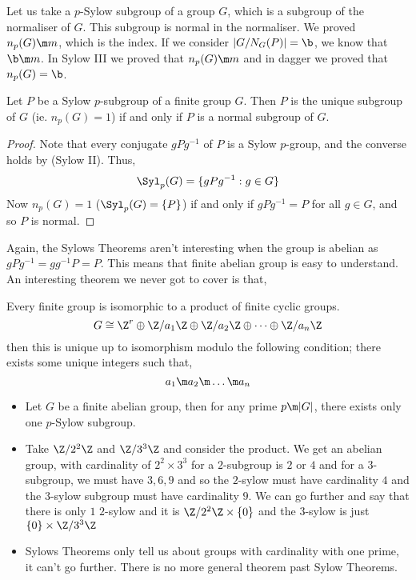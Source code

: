 \noindent
Let us take a $p$-Sylow subgroup of a group $G$, which is a subgroup of the normaliser of $G$. This subgroup is normal in the normaliser. We proved $n_p(G) \m m$, which is the index. If we consider $|G/N_G(P)| = \b$, we know that $\b \m m$. In Sylow III we proved that $n_p(G) \m m$ and in dagger we proved that $n_p(G) = \b$.

\begin{ncor}
  Let $P$ be a Sylow $p$-subgroup of a finite group $G$. Then $P$ is the unique subgroup of $G$ (ie. $n_p(G) = 1$) if and only if $P$ is a normal subgroup of $G$.
\end{ncor}
\begin{proof}
  Note that every conjugate $gPg^{-1}$ of $P$ is a Sylow $p$-group, and the converse holds by (Sylow II). Thus,
  $$ \Syl_p(G) = \{gPg^{-1} : g \in G\} $$
  Now $n_p(G) = 1$ ($\Syl_p(G) = \{P\}$) if and only if $gPg^{-1} = P$ for all $g \in G$, and so $P$ is normal.
\end{proof}

Again, the Sylows Theorems aren't interesting when the group is abelian as $gPg^{-1} = gg^{-1}P = P$. This means that finite abelian group is easy to understand.\\

An interesting theorem we never got to cover is that,
\begin{nthm}
  Every finite group is isomorphic to a product of finite cyclic groups.
  $$ G \cong \Z^r \oplus \Z/a_1\Z \oplus \Z/a_2\Z \oplus \dots \oplus \Z/a_n\Z $$
  then this is unique up to isomorphism modulo the following condition; there exists some unique integers such that,
  $$ a_1 \m a_2 \m \dots \m a_n $$
\end{nthm}
\begin{eg}
  \begin{itemize}
    \item Let $G$ be a finite abelian group, then for any prime $p \m |G|$, there exists only one $p$-Sylow subgroup.
    \item Take $\Z/2^2\Z$ and $\Z/3^3\Z$ and consider the product. We get an abelian group, with cardinality of $2^2 \times 3^3$ for a $2$-subgroup is $2$ or $4$ and for a $3$-subgroup, we must have $3,6,9$ and so the $2$-sylow must have cardinality $4$ and the $3$-sylow subgroup must have cardinality $9$. We can go further and say that there is only $1$ $2$-sylow and it is $\Z/2^2\Z \times \{0\}$ and the $3$-sylow is just $\{0\}\times\Z/3^3\Z$
    \item Sylows Theorems only tell us about groups with cardinality with one prime, it can't go further. There is no more general theorem past Sylow Theorems.
  \end{itemize}
\end{eg}

